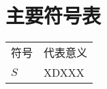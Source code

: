 \chapter*{\hfill 主要符号表 \hfill}\label{chap:00}

\begin{table*}[htbp]
  \centering
  \vspace{0.2cm}
  \daxiaosi
\begin{tabular}{p{5cm}p{5cm}}
  \toprule
符号&代表意义\\
$S$&XDXXX\\
 \bottomrule
\end{tabular}
\end{table*}
